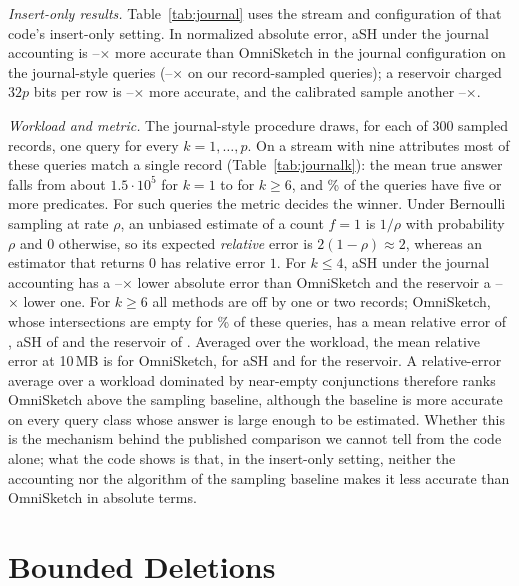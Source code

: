 \documentclass[sigconf,review,anonymous]{acmart}
\newcommand{\omni}{OmniSketch\xspace}
\begin{document}
\emph{Insert-only results.} Table~\ref{tab:journal} uses the stream and configuration of that code's
insert-only setting. In normalized absolute error, aSH under the journal accounting is
\NumJSOmniVsAshLo--\NumJSOmniVsAshHi$\times$ more accurate than \omni in the journal configuration on the
journal-style queries (\NumJROmniVsAshLo--\NumJROmniVsAshHi$\times$ on our record-sampled queries); a
reservoir charged $32p$ bits per row is \NumJSOmniVsResLo--\NumJSOmniVsResHi$\times$ more accurate, and
the calibrated sample another \NumJSCalTwoVsResLo--\NumJSCalTwoVsResHi$\times$.

\emph{Workload and metric.} The journal-style procedure draws, for each of 300 sampled records, one query
for every $k=1,\dots,p$. On a stream with nine attributes most of these queries match a single record
(Table~\ref{tab:journalk}): the mean true answer falls from about $1.5\cdot10^5$ for $k=1$ to
\NumJKTruthHigh{} for $k\ge6$, and \NumJKShareHigh\% of the queries have five or more predicates. For such
queries the metric decides the winner. Under Bernoulli sampling at rate $\rho$, an unbiased estimate of a
count $f=1$ is $1/\rho$ with probability $\rho$ and $0$ otherwise, so its expected \emph{relative} error
is $2(1-\rho)\approx2$, whereas an estimator that returns $0$ has relative error $1$. For $k\le4$, aSH
under the journal accounting has a \NumJKAshAbsLo--\NumJKAshAbsHi$\times$ lower absolute error than \omni
and the reservoir a \NumJKResAbsLo--\NumJKResAbsHi$\times$ lower one. For $k\ge6$ all methods are off by
one or two records; \omni, whose intersections are empty for \NumJKOmniZeroHigh\% of these queries, has a
mean relative error of \NumJKOmniRelHigh, aSH of \NumJKAshRelHigh{} and the reservoir of
\NumJKResRelHigh. Averaged over the workload, the mean relative error at 10\,MB is \NumJSMreOmni{} for
\omni, \NumJSMreAsh{} for aSH and \NumJSMreRes{} for the reservoir. A relative-error average over a
workload dominated by near-empty conjunctions therefore ranks \omni above the sampling baseline, although
the baseline is more accurate on every query class whose answer is large enough to be estimated. Whether
this is the mechanism behind the published comparison we cannot tell from the code alone; what the code
shows is that, in the insert-only setting, neither the accounting nor the algorithm of the sampling
baseline makes it less accurate than \omni in absolute terms.

\section{Bounded Deletions}\label{app:deletes}
\end{document}
